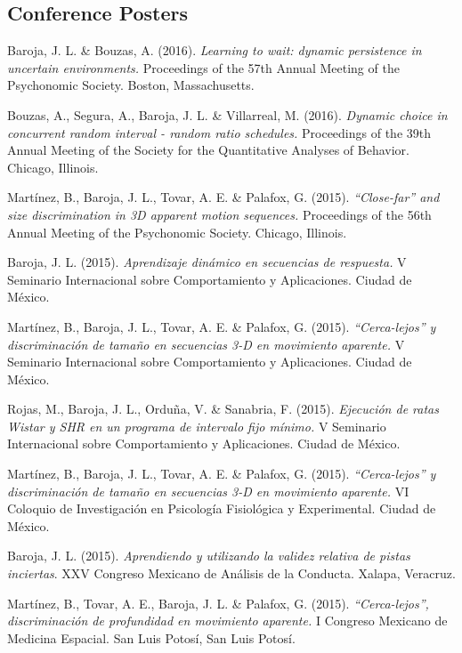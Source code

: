 \documentclass[letterpaper]{article}
\renewenvironment{itemize}{
  \begin{list}{}{
    \setlength{\leftmargin}{1.5em}
  }
}{
  \end{list}
}
\begin{document}
\subsection*{Conference Posters}
\begin{itemize}
\setlength\itemsep{-.25em}
\setlength{\itemindent}{-.125in}
	\item Baroja, J. L. \& Bouzas, A. (2016). \emph{Learning to wait: dynamic persistence in uncertain environments.} Proceedings of the 57th Annual Meeting of the Psychonomic Society. Boston, Massachusetts.
	\item{Bouzas, A., Segura, A., Baroja, J. L. \& Villarreal, M. (2016). \emph{Dynamic choice in concurrent random interval - random ratio schedules.} Proceedings of the 39th Annual Meeting of the Society for the Quantitative Analyses of Behavior. Chicago, Illinois.}
	\item Martínez, B., Baroja, J. L., Tovar, A. E. \& Palafox, G. (2015). \emph{``Close-far'' and size discrimination in 3D apparent motion sequences.} Proceedings of the 56th Annual Meeting of the Psychonomic Society. Chicago, Illinois.
	\item Baroja, J. L. (2015). \emph{Aprendizaje dinámico en secuencias de respuesta.} V Seminario Internacional sobre Comportamiento y Aplicaciones. Ciudad de México.
	\item Martínez, B., Baroja, J. L., Tovar, A. E. \& Palafox, G. (2015). \emph{``Cerca-lejos'' y discriminación de tamaño en secuencias 3-D en movimiento aparente.} V Seminario Internacional sobre Comportamiento y Aplicaciones. Ciudad de México.
	\item Rojas, M., Baroja, J. L., Orduña, V. \& Sanabria, F. (2015). \emph{Ejecución de ratas Wistar y SHR en un programa de intervalo fijo mínimo.} V Seminario Internacional sobre Comportamiento y Aplicaciones. Ciudad de México.
	\item Martínez, B., Baroja, J. L., Tovar, A. E. \& Palafox, G. (2015). \emph{``Cerca-lejos'' y discriminación de tamaño en secuencias 3-D en movimiento aparente.} VI Coloquio de Investigación en Psicología Fisiológica y Experimental. Ciudad de México.
	\item Baroja, J. L. (2015). \emph{Aprendiendo y utilizando la validez relativa de pistas inciertas}. XXV Congreso Mexicano de Análisis de la Conducta. Xalapa, Veracruz.
	\item Martínez, B., Tovar, A. E., Baroja, J. L. \& Palafox, G. (2015). \emph{``Cerca-lejos'', discriminación de profundidad en movimiento aparente.} I Congreso Mexicano de Medicina Espacial. San Luis Potosí, San Luis Potosí.

\end{itemize}
\end{document}
